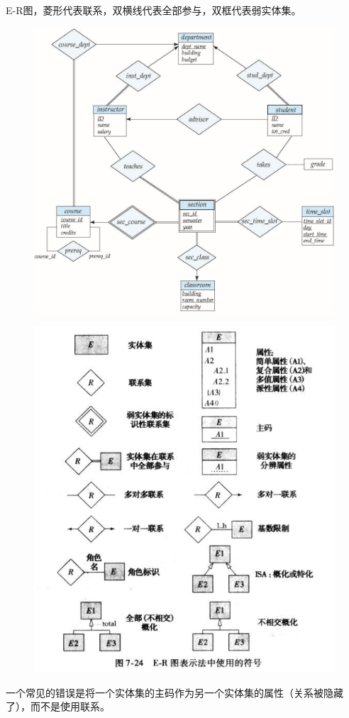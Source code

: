 E-R图，菱形代表联系，双横线代表全部参与，双框代表弱实体集。
\begin{figure}[H]
\centering
\includegraphics[width=0.6\linewidth]{fig/university_E-R.png}
\end{figure}
\begin{figure}[H]
\centering
\includegraphics[width=0.5\linewidth]{fig/E-R-figure.png}
\end{figure}

一个常见的错误是将一个实体集的主码作为另一个实体集的属性（关系被隐藏了），而不是使用联系。

